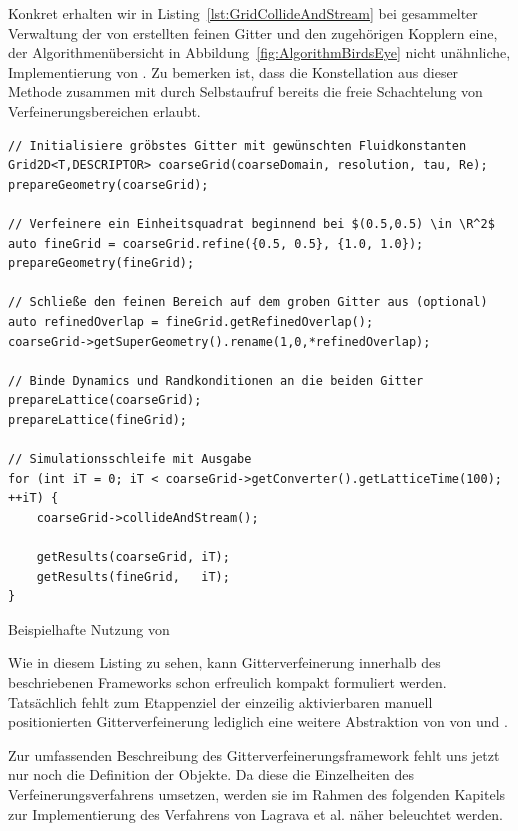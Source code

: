 Konkret erhalten wir in Listing~\ref{lst:GridCollideAndStream} bei gesammelter Verwaltung der von  erstellten feinen Gitter und den zugehörigen Kopplern eine, der Algorithmenübersicht in Abbildung~\ref{fig:AlgorithmBirdsEye} nicht unähnliche, Implementierung von .
Zu bemerken ist, dass die Konstellation aus dieser Methode zusammen mit  durch Selbstaufruf bereits die freie Schachtelung von Verfeinerungsbereichen erlaubt.

\begin{listing}[H]
\begin{verbatim}
// Initialisiere gröbstes Gitter mit gewünschten Fluidkonstanten
Grid2D<T,DESCRIPTOR> coarseGrid(coarseDomain, resolution, tau, Re);
prepareGeometry(coarseGrid);

// Verfeinere ein Einheitsquadrat beginnend bei $(0.5,0.5) \in \R^2$
auto fineGrid = coarseGrid.refine({0.5, 0.5}, {1.0, 1.0});
prepareGeometry(fineGrid);

// Schließe den feinen Bereich auf dem groben Gitter aus (optional)
auto refinedOverlap = fineGrid.getRefinedOverlap();
coarseGrid->getSuperGeometry().rename(1,0,*refinedOverlap);

// Binde Dynamics und Randkonditionen an die beiden Gitter
prepareLattice(coarseGrid);
prepareLattice(fineGrid);

// Simulationsschleife mit Ausgabe
for (int iT = 0; iT < coarseGrid->getConverter().getLatticeTime(100); ++iT) {
	coarseGrid->collideAndStream();

	getResults(coarseGrid, iT);
	getResults(fineGrid,   iT);
}
\end{verbatim}
\caption{Beispielhafte Nutzung von }
\label{lst:RefinementUsageExample}
\end{listing}

Wie in diesem Listing zu sehen, kann Gitterverfeinerung innerhalb des beschriebenen Frameworks schon erfreulich kompakt formuliert werden. Tatsächlich fehlt zum Etappenziel der einzeilig aktivierbaren manuell positionierten Gitterverfeinerung lediglich eine weitere Abstraktion von von  und .

\bigskip
Zur umfassenden Beschreibung des Gitterverfeinerungsframework fehlt uns jetzt nur noch die Definition der  Objekte. Da diese die Einzelheiten des Verfeinerungsverfahrens umsetzen, werden sie im Rahmen des folgenden Kapitels zur Implementierung des Verfahrens von Lagrava et al. näher beleuchtet werden.

